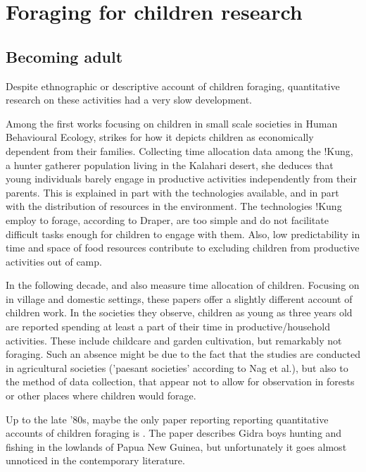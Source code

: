 \section{Foraging for children research}

\subsection{Becoming adult}
Despite ethnographic or descriptive account of children foraging, quantitative research on these activities had a very slow development.

Among the first works focusing on children in small scale societies in Human Behavioural Ecology, \cite{lee_social_1976} strikes for how it depicts children as economically dependent from their families. Collecting time allocation data among the !Kung, a hunter gatherer population living in the Kalahari desert, she deduces that young individuals barely engage in productive activities independently from their parents. This is explained in part with the technologies available, and in part with the distribution of resources in the environment. The technologies !Kung employ to forage, according to Draper, are too simple and do not facilitate difficult tasks enough for children to engage with them. Also, low predictability in time and space of food resources contribute to excluding children from productive activities out of camp. 

In the following decade, \cite{nag_anthropological_1978} and \cite{munroe_childrens_1984} also measure time allocation of children. Focusing on in village and domestic settings, these papers offer a slightly different account of children work. In the societies they observe, children as young as three years old are reported spending at least a part of their time in productive/household activities. These include childcare and garden cultivation, but remarkably not foraging. Such an absence might be due to the fact that the studies are conducted in agricultural societies ('paesant societies' according to Nag et al.), but also to the method of data collection, that appear not to allow for observation in forests or other places where children would forage. 

Up to the late '80s, maybe the only paper reporting reporting quantitative accounts of children foraging is \cite{kawabe_development_1983}. The paper describes Gidra boys hunting and fishing in the lowlands of Papua New Guinea, but unfortunately it goes almost unnoticed in the contemporary literature. 

